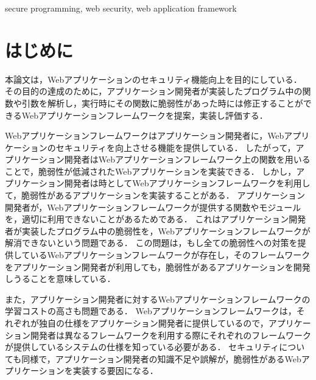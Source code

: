 \documentclass[submit]{ipsj}
\begin{document}
\begin{ekeyword}
secure programming, web security, web application framework
\end{ekeyword}

\maketitle

\section{はじめに}
本論文は，Webアプリケーションのセキュリティ機能向上を目的にしている．
その目的の達成のために，アプリケーション開発者が実装したプログラム中の関数や引数を解析し，実行時にその関数に脆弱性があった時には修正することができるWebアプリケーションフレームワークを提案，実装し評価する．

Webアプリケーションフレームワークはアプリケーション開発者に，Webアプリケーションのセキュリティを向上させる機能を提供している．
したがって，アプリケーション開発者はWebアプリケーションフレームワーク上の関数を用いることで，脆弱性が低減されたWebアプリケーションを実装できる．
しかし，アプリケーション開発者は時としてWebアプリケーションフレームワークを利用して，脆弱性があるアプリケーションを実装することがある．
アプリケーション開発者が，Webアプリケーションフレームワークが提供する関数やモジュールを，適切に利用できないことがあるためである．
これはアプリケーション開発者が実装したプログラム中の脆弱性を，Webアプリケーションフレームワークが解消できないという問題である．
この問題は，もし全ての脆弱性への対策を提供しているWebアプリケーションフレームワークが存在し，そのフレームワークをアプリケーション開発者が利用しても，脆弱性があるアプリケーションを開発しうることを意味している．

また，アプリケーション開発者に対するWebアプリケーションフレームワークの学習コストの高さも問題である．
Webアプリケーションフレームワークは，それぞれが独自の仕様をアプリケーション開発者に提供しているので，アプリケーション開発者は異なるフレームワークを利用する際にそれぞれのフレームワークが提供しているシステムの仕様を知っている必要がある．
セキュリティについても同様で，アプリケーション開発者の知識不足や誤解が，脆弱性があるWebアプリケーションを実装する要因になる．
\end{document}

